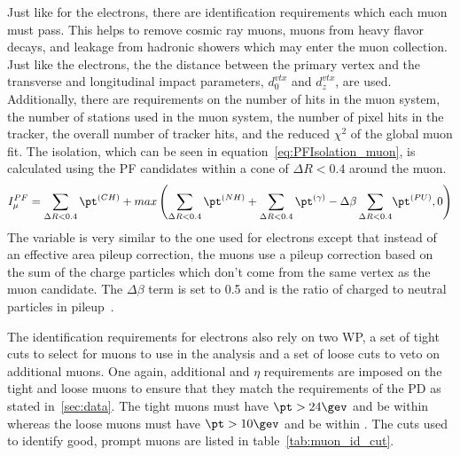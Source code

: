 Just like for the electrons, there are identification requirements which each muon must pass. This helps to remove cosmic ray muons, muons from heavy flavor decays, and leakage from hadronic showers which may enter the muon collection. Just like the electrons, the the distance between the primary vertex and the transverse and longitudinal impact parameters, $d_{0}^{vtx}$ and $d_{z}^{vtx}$, are used. Additionally, there are requirements on the number of hits in the muon system, the number of stations used in the muon system, the number of pixel hits in the tracker, the overall number of tracker hits, and the reduced $\chi^{2}$ of the global muon fit. The isolation, which can be seen in equation~\ref{eq:PFIsolation_muon}, is calculated using the PF candidates within a cone of $\Delta{R}<0.4$ around the muon.
\begin{equation}
\label{eq:PFIsolation_muon}
I_{\mu}^{PF}=\sum_{\Delta{R}<0.4}\pt^{\left(CH\right)}+max\left(\sum_{\Delta{R}<0.4}\pt^{\left(NH\right)}+\sum_{\Delta{R}<0.4}\pt^{\left(\gamma\right)}-{\Delta\beta\sum_{\Delta{R}<0.4}}\pt^{\left(PU\right)},0\right)
\end{equation}
The variable is very similar to the one used for electrons except that instead of an effective area pileup correction, the muons use a pileup correction based on the sum \pt of the charge particles which don't come from the same vertex as the muon candidate. The $\Delta\beta$ term is set to 0.5 and is the ratio of charged to neutral particles in pileup~\cite{CMS-PAS-PFT-10-002}.

The identification requirements for electrons also rely on two WP, a set of tight cuts to select for muons to use in the analysis and a set of loose cuts to veto on additional muons. One again, additional \pt and $\eta$ requirements are imposed on the tight and loose muons to ensure that they match the requirements of the PD as stated in~\ref{sec:data}. The tight muons must have $\pt>24\gev$ and be within  whereas the loose muons must have $\pt>10\gev$ and be within . The cuts used to identify good, prompt muons are listed in table~\ref{tab:muon_id_cut}.

